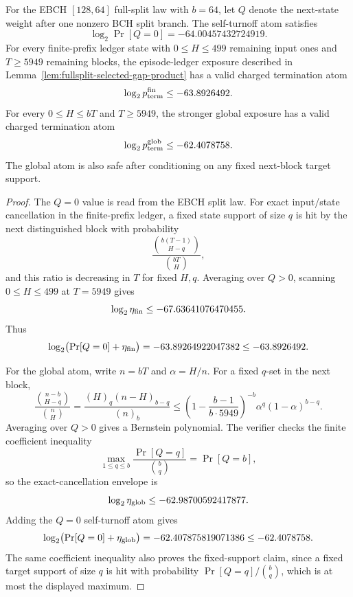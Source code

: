 \begin{lemma}
\label{lem:fullsplit-certified-termination-atoms}
For the EBCH \([128,64]\) full-split law with \(b=64\), let \(Q\) denote the next-state weight after one nonzero BCH
split branch.  The self-turnoff atom satisfies
\[
\log_2\Pr[Q=0]=-64.00457432724919.
\]
For every finite-prefix ledger state with \(0\le H\le499\) remaining input ones and \(T\ge5949\) remaining blocks, the
episode-ledger exposure described in Lemma~\ref{lem:fullsplit-selected-gap-product} has a valid charged termination atom
\[
\log_2 p_{\rm term}^{\rm fin}\le -63.8926492.
\]
For every \(0\le H\le bT\) and \(T\ge5949\), the stronger global exposure has a valid charged termination atom
\[
\log_2 p_{\rm term}^{\rm glob}\le -62.4078758.
\]
The global atom is also safe after conditioning on any fixed next-block target support.
\end{lemma}

\begin{proof}
The \(Q=0\) value is read from the EBCH split law.  For exact input/state cancellation in the finite-prefix ledger, a
fixed state support of size \(q\) is hit by the next distinguished block with probability
\[
\frac{\binom{b(T-1)}{H-q}}{\binom{bT}{H}},
\]
and this ratio is decreasing in \(T\) for fixed \(H,q\).  Averaging over \(Q>0\), scanning \(0\le H\le499\) at
\(T=5949\) gives
\[
\log_2\eta_{\rm fin}\le -67.63641076470455.
\]
Thus
\[
\log_2\bigl(\Pr[Q=0]+\eta_{\rm fin}\bigr)
=-63.89264922047382
\le -63.8926492.
\]

For the global atom, write \(n=bT\) and \(\alpha=H/n\).  For a fixed \(q\)-set in the next block,
\[
\frac{\binom{n-b}{H-q}}{\binom{n}{H}}
=\frac{(H)_q(n-H)_{b-q}}{(n)_b}
\le
\left(1-\frac{b-1}{b\cdot5949}\right)^{-b}\alpha^q(1-\alpha)^{b-q}.
\]
Averaging over \(Q>0\) gives a Bernstein polynomial.  The verifier checks the finite coefficient inequality
\[
\max_{1\le q\le b}\frac{\Pr[Q=q]}{\binom bq}=\Pr[Q=b],
\]
so the exact-cancellation envelope is
\[
\log_2\eta_{\rm glob}\le -62.98700592417877.
\]
Adding the \(Q=0\) self-turnoff atom gives
\[
\log_2\bigl(\Pr[Q=0]+\eta_{\rm glob}\bigr)
=-62.407875819071386
\le -62.4078758.
\]
The same coefficient inequality also proves the fixed-support claim, since a fixed target support of size \(q\) is hit
with probability \(\Pr[Q=q]/\binom bq\), which is at most the displayed maximum.
\end{proof}

